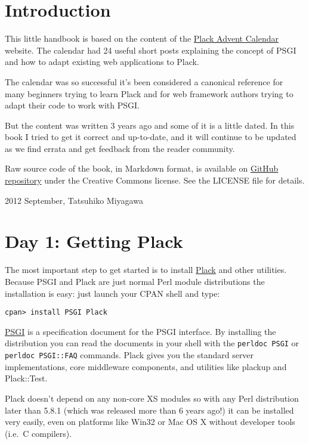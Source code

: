 \chapter{Introduction}\label{introduction}

This little handbook is based on the content of the
\href{http://advent.plackperl.org/}{Plack Advent Calendar} website. The
calendar had 24 useful short posts explaining the concept of PSGI and
how to adapt existing web applications to Plack.

The calendar was so successful it's been considered a canonical
reference for many beginners trying to learn Plack and for web framework
authors trying to adapt their code to work with PSGI.

But the content was written 3 years ago and some of it is a little
dated. In this book I tried to get it correct and up-to-date, and it
will continue to be updated as we find errata and get feedback from the
reader community.

Raw source code of the book, in Markdown format, is available on
\href{https://github.com/miyagawa/plack-handbook}{GitHub repository}
under the Creative Commons license. See the LICENSE file for details.

2012 September, Tatsuhiko Miyagawa

\chapter{Day 1: Getting Plack}\label{day-1-getting-plack}

The most important step to get started is to install
\href{http://search.cpan.org/dist/Plack}{Plack} and other utilities.
Because PSGI and Plack are just normal Perl module distributions the
installation is easy: just launch your CPAN shell and type:

\begin{lstlisting}
cpan> install PSGI Plack
\end{lstlisting}

\href{http://search.cpan.org/dist/PSGI}{PSGI} is a specification
document for the PSGI interface. By installing the distribution you can
read the documents in your shell with the \lstinline!perldoc PSGI! or
\lstinline!perldoc PSGI::FAQ! commands. Plack gives you the standard
server implementations, core middleware components, and utilities like
plackup and Plack::Test.

Plack doesn't depend on any non-core XS modules so with any Perl
distribution later than 5.8.1 (which was released more than 6 years
ago!) it can be installed very easily, even on platforms like Win32 or
Mac OS X without developer tools (i.e.~C compilers).

